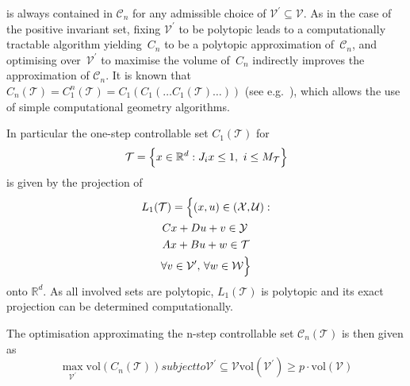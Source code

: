 \documentclass{ifacconf}
\providecommand{\vol}{\text{vol}}
\providecommand{\C}{\mathcal C}
\providecommand{\W}{\mathcal W}
\providecommand{\V}{\mathcal V}
\providecommand{\X}{\mathcal X}
\providecommand{\Y}{\mathcal Y}
\providecommand{\U}{\mathcal U}
\providecommand{\T}{\mathcal T}
\providecommand{\RR}{\mathbb R}
\begin{document}
%
is always contained in $\C_n$ for any admissible choice of $\V^\prime\subseteq\V$.
%
As in the case of the positive invariant set, fixing $\V^\prime$ to be polytopic leads to a computationally tractable algorithm yielding~$C_n$ to be a polytopic approximation of~$\C_n$, and optimising over~$\V^\prime$ to maximise the volume of~$C_n$ indirectly improves the approximation of $\C_n$.
%
It is known that $C_n(\T) = C^n_1(\T) = C_1(C_1(\dots C_1(\T)\dots))$ (see e.g.~\cite{blanchini:2007}), which allows the use of simple computational geometry algorithms.

In particular the one-step controllable set $C_1(\T)$ for 
\[
\T = \Bigl\{x\in\RR^d : J_i x\leq1,\ i\leq M_\T\Bigr\}
\]
is given by the projection of 
%
\begin{multline*}
L_1(\T) = \Bigl\{(x,u)\in (\X,\U): \\
\begin{aligned}
& Cx+Du + v\in\Y \\
& Ax+Bu+w\in\T
\end{aligned}\\
\forall v\in\V^\prime,\, \forall w\in\W\Bigr\}
\end{multline*}
%
onto $\RR^d$.
%
As all involved sets are polytopic, $L_1(\T)$ is polytopic and its exact projection can be determined computationally.

The optimisation approximating the n-step controllable set $\C_n(\T)$ is then given as
%
\begin{subequations}\label{seq:optimisation:n:step:set:abstract}
	\begin{equation}
		\max_{\V^\prime} \vol(C_n(\T))
	\end{equation}
	subject to
	\begin{equation}
	\V^\prime\subseteq\V
\end{equation}
%
\begin{equation}
	\vol(\V^\prime)\geq p\cdot\vol(\V)
\end{equation}
\end{subequations}
\end{document}
